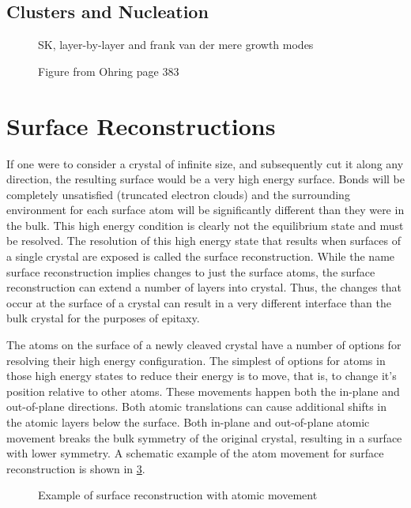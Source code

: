 \subsection{Clusters and Nucleation}
\begin{figure}
    \centering
    \caption{\label{fig:back_growth_mode}SK, layer-by-layer and frank van der mere growth modes}
\end{figure}

\begin{figure}
    \centering
    \caption{\label{fig:back_nucleation_regions}Figure from Ohring page 383}
\end{figure}

\section{Surface Reconstructions} 
If one were to consider a crystal of infinite size, and subsequently cut it along any direction, the resulting surface would be a very high energy surface. Bonds will be completely unsatisfied (truncated electron clouds) and the surrounding environment for each surface atom will be significantly different than they were in the bulk. This high energy condition is clearly not the equilibrium state and must be resolved. The resolution of this high energy state that results when surfaces of a single crystal are exposed is called the surface reconstruction. While the name surface reconstruction implies changes to just the surface atoms, the surface reconstruction can extend a number of layers into crystal. Thus, the changes that occur at the surface of a crystal can result in a very different interface than the bulk crystal for the purposes of epitaxy.

The atoms on the surface of a newly cleaved crystal have a number of options for resolving their high energy configuration. The simplest of options for atoms in those high energy states to reduce their energy is to move, that is, to change it's position relative to other atoms. These movements happen both the in-plane and out-of-plane directions. Both atomic translations can cause additional shifts in the atomic layers below the surface.  Both in-plane and out-of-plane atomic movement breaks the bulk symmetry of the original crystal, resulting in a surface with lower symmetry. A schematic example of the atom movement for surface reconstruction is shown in \cref{fig:back_recon_move}.
\begin{figure}
    \centering
    \caption{\label{fig:back_recon_move}Example of surface reconstruction with atomic movement}
\end{figure}

